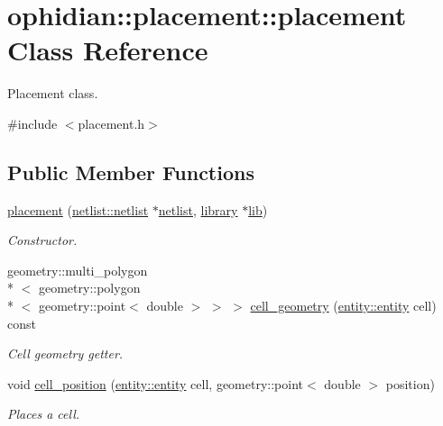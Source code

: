\hypertarget{classophidian_1_1placement_1_1placement}{\section{ophidian\-:\-:placement\-:\-:placement Class Reference}
\label{classophidian_1_1placement_1_1placement}
}


Placement class.  




{\ttfamily \#include $<$placement.\-h$>$}

\subsection*{Public Member Functions}
\begin{DoxyCompactItemize}
\item 
\hyperlink{classophidian_1_1placement_1_1placement_a17dbf29ab5648b435f49bdeff92066fb}{placement} (\hyperlink{classophidian_1_1netlist_1_1netlist}{netlist\-::netlist} $\ast$\hyperlink{classophidian_1_1placement_1_1placement_a2e1a15ace1eb476ea2f7ce6d8d84e3c3}{netlist}, \hyperlink{classophidian_1_1placement_1_1library}{library} $\ast$\hyperlink{classophidian_1_1placement_1_1placement_a302206279c67c772dff944b9fd4d19fb}{lib})
\begin{DoxyCompactList}\small\item\em Constructor. \end{DoxyCompactList}\item 
geometry\-::multi\-\_\-polygon\\*
$<$ geometry\-::polygon\\*
$<$ geometry\-::point$<$ double $>$ $>$ $>$ \hyperlink{classophidian_1_1placement_1_1placement_aa0bfafbf7f6c7d1e255c1523e6e4373c}{cell\-\_\-geometry} (\hyperlink{classophidian_1_1entity_1_1entity}{entity\-::entity} cell) const 
\begin{DoxyCompactList}\small\item\em Cell geometry getter. \end{DoxyCompactList}\item 
void \hyperlink{classophidian_1_1placement_1_1placement_a4e96c8af7753fef2be87c318e8cf16f6}{cell\-\_\-position} (\hyperlink{classophidian_1_1entity_1_1entity}{entity\-::entity} cell, geometry\-::point$<$ double $>$ position)
\begin{DoxyCompactList}\small\item\em Places a cell. \end{DoxyCompactList}\item 

\end{DoxyCompactItemize}
